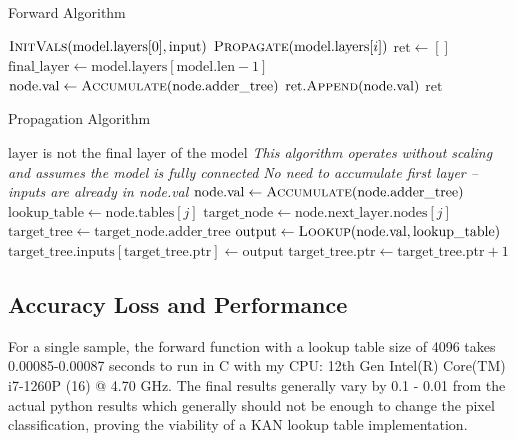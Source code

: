 \documentclass[psamsfonts]{amsart}
\theoremstyle{definition}
\theoremstyle{remark}
\numberwithin{equation}{section}
\begin{document}
\begin{algorithm}[H]
  \caption{Forward Algorithm}
  \label{alg:forward}
  \begin{algorithmic}[1]
    \State $\Call{InitVals}{\text{model}.\text{layers}[0], \text{input}}$
    \State $\Call{Propagate}{\text{model}.\text{layers}[i]}$
    \EndFor
    \State $\text{ret} \gets []$
    \State $\text{final\_layer} \gets \text{model}.\text{layers}[\text{model}.\text{len} - 1]$
    \State $\text{node}.\text{val} \gets \Call{Accumulate}{\text{node}.\text{adder\_tree}}$
    \State $\text{ret}.\Call{Append}{\text{node}.\text{val}}$
    \EndFor
    \State \Return $\text{ret}$
    \EndFunction
  \end{algorithmic}
\end{algorithm}

\begin{algorithm}[H]
  \caption{Propagation Algorithm}
  \label{alg:propagate}
  \begin{algorithmic}[1]
    \Require $\text{layer}$ is not the final layer of the model
    \Statex \textit{This algorithm operates without scaling and assumes the model is fully connected}
    \State \textit{No need to accumulate first layer -- inputs are already in node.val}
    \State $\text{node}.\text{val} \gets \Call{Accumulate}{\text{node}.\text{adder\_tree}}$
    \EndIf
    \State $\text{lookup\_table} \gets \text{node}.\text{tables}[j]$
    \State $\text{target\_node} \gets \text{node}.\text{next\_layer}.\text{nodes}[j]$
    \State $\text{target\_tree} \gets \text{target\_node}.\text{adder\_tree}$
    \State $\text{output} \gets \Call{Lookup}{\text{node}.\text{val}, \text{lookup\_table}}$
    \State $\text{target\_tree}.\text{inputs}[\text{target\_tree}.\text{ptr}] \gets \text{output}$
    \State $\text{target\_tree}.\text{ptr} \gets \text{target\_tree}.\text{ptr} + 1$
    \EndFor
    \EndFor
    \EndFunction
  \end{algorithmic}
\end{algorithm}


\subsection{Accuracy Loss and Performance}
For a single sample, the forward function with a lookup table size of 4096 takes 0.00085-0.00087 seconds to run in C with my CPU: 12th Gen Intel(R) Core(TM) i7-1260P (16) @ 4.70 GHz. The final results generally vary by 0.1 - 0.01 from the actual python results which generally should not be enough to change the pixel classification, proving the viability of a KAN lookup table implementation.
\end{document}

